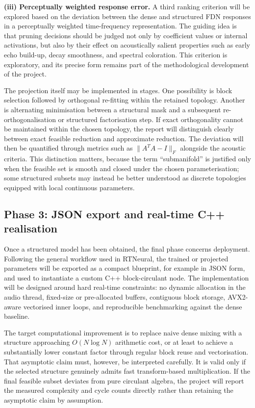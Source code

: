 \documentclass[12pt,a4paper]{article}
\begin{document}
\textbf{(iii) Perceptually weighted response error.}
A third ranking criterion will be explored based on the deviation between the
dense and structured FDN responses in a perceptually weighted time-frequency
representation. The guiding idea is that pruning decisions should be judged not
only by coefficient values or internal activations, but also by their effect on
acoustically salient properties such as early echo build-up, decay smoothness,
and spectral coloration. This criterion is exploratory, and its precise form
remains part of the methodological development of the project.

The projection itself may be implemented in stages. One possibility is block
selection followed by orthogonal re-fitting within the retained topology.
Another is alternating minimisation between a structural mask and a subsequent
re-orthogonalisation or structured factorisation step. If exact orthogonality cannot be maintained within the chosen topology, the
report will distinguish clearly between exact feasible reduction and approximate
reduction. The deviation will then be quantified through metrics such as
$\|A^T A - I\|_F$ alongside the acoustic criteria. This distinction matters,
because the term ``submanifold'' is justified only when the feasible set is
smooth and closed under the chosen parameterisation; some structured subsets may
instead be better understood as discrete topologies equipped with local
continuous parameters.

\subsection{Phase 3: JSON export and real-time C++ realisation}

Once a structured model has been obtained, the final phase concerns deployment.
Following the general workflow used in RTNeural, the trained or projected
parameters will be exported as a compact blueprint, for example in JSON form,
and used to instantiate a custom C++ block-circulant node. The implementation
will be designed around hard real-time constraints: no dynamic allocation in the
audio thread, fixed-size or pre-allocated buffers, contiguous block storage,
AVX2-aware vectorised inner loops, and reproducible benchmarking against the
dense baseline.

The target computational improvement is to replace naive dense mixing with a
structure approaching $O(N \log N)$ arithmetic cost, or at least to achieve a
substantially lower constant factor through regular block reuse and
vectorisation. That asymptotic claim must, however, be interpreted carefully.
It is valid only if the selected structure genuinely admits fast transform-based
multiplication. If the final feasible subset deviates from pure circulant
algebra, the project will report the measured complexity and cycle counts
directly rather than retaining the asymptotic claim by assumption.
\end{document}
